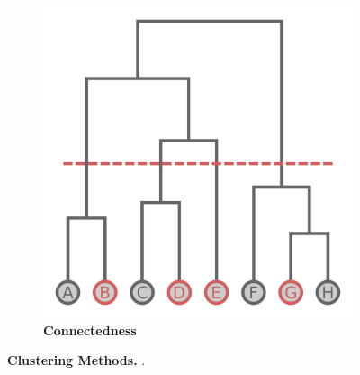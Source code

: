 \begin{figure}
\begin{adjustbox}{minipage=\dimexpr{}\fboxrule,fbox}
\begin{subfigure}[b]{0.475\textwidth}
            \includegraphics[width=\textwidth]{Extra_Graphics/Connectedness.pdf}
            \caption[Connectedness]{\textbf{Connectedness}}
            \label{fig:1.0.3b}
        \end{subfigure}
    \end{adjustbox}
    \caption[Clustering Methods]{\textbf{Clustering Methods.} .}
    \label{fig:1.0.3}
\end{figure}

\blindtext

